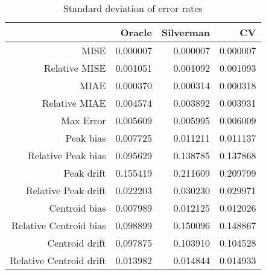 \begin{table}[ht]
\centering
\begin{tabular}{rrrr}
  \hline
 & Oracle & Silverman & CV \\ 
  \hline
MISE & 0.000007 & 0.000007 & 0.000007 \\ 
  Relative MISE & 0.001051 & 0.001092 & 0.001093 \\ 
  MIAE & 0.000370 & 0.000314 & 0.000318 \\ 
  Relative MIAE & 0.004574 & 0.003892 & 0.003931 \\ 
  Max Error & 0.005609 & 0.005995 & 0.006009 \\ 
  Peak bias & 0.007725 & 0.011211 & 0.011137 \\ 
  Relative Peak bias & 0.095629 & 0.138785 & 0.137868 \\ 
  Peak drift & 0.155419 & 0.211609 & 0.209799 \\ 
  Relative Peak drift & 0.022203 & 0.030230 & 0.029971 \\ 
  Centroid bias & 0.007989 & 0.012125 & 0.012026 \\ 
  Relative Centroid bias & 0.098899 & 0.150096 & 0.148867 \\ 
  Centroid drift & 0.097875 & 0.103910 & 0.104528 \\ 
  Relative Centroid drift & 0.013982 & 0.014844 & 0.014933 \\ 
   \hline
\end{tabular}
\caption{Standard deviation of error rates} 
\label{tbl:stddev_error_rates}
\end{table}
